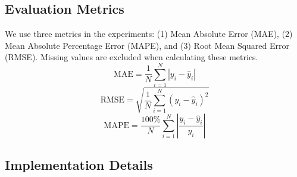 \documentclass[5p,times,authoryear]{elsarticle}
\begin{document}
\subsection{Evaluation Metrics}

We use three metrics in the experiments: (1) Mean Absolute Error (MAE), (2) Mean Absolute Percentage Error (MAPE), and (3) Root Mean Squared Error (RMSE). Missing values are excluded when calculating these metrics.
\vspace{-8pt}
\begin{equation}
\text{MAE} = \frac{1}{N}\sum_{i=1}^{N}|y_i - \hat{y}_i| \label{eq:mae}
\end{equation}
\vspace{-15pt}
\begin{equation}
\text{RMSE} = \sqrt{\frac{1}{N}\sum_{i=1}^{N}(y_i - \hat{y}_i)^2} \label{eq:rmse}
\end{equation}
\vspace{-15pt}
\begin{equation}
\text{MAPE} = \frac{100\%}{N}\sum_{i=1}^{N}\left|\frac{y_i - \hat{y}_i}{y_i}\right| \label{eq:mape}
\end{equation}
\vspace{-15pt}

\subsection{Implementation Details}

\end{document}
